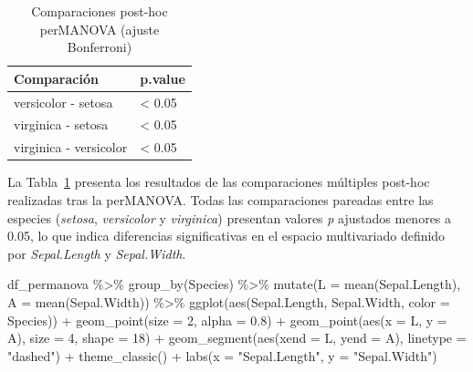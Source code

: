 \documentclass[
  spanish,
  11pt,
  a4paper,
  DIV=11,
  numbers=noendperiod]{scrartcl}
\newenvironment{Shaded}{\begin{snugshade}}{\end{snugshade}}
\newcommand{\AttributeTok}[1]{\textcolor[rgb]{0.40,0.45,0.13}{#1}}
\newcommand{\DecValTok}[1]{\textcolor[rgb]{0.68,0.00,0.00}{#1}}
\newcommand{\FloatTok}[1]{\textcolor[rgb]{0.68,0.00,0.00}{#1}}
\newcommand{\FunctionTok}[1]{\textcolor[rgb]{0.28,0.35,0.67}{#1}}
\newcommand{\NormalTok}[1]{\textcolor[rgb]{0.00,0.23,0.31}{#1}}
\newcommand{\SpecialCharTok}[1]{\textcolor[rgb]{0.37,0.37,0.37}{#1}}
\newcommand{\StringTok}[1]{\textcolor[rgb]{0.13,0.47,0.30}{#1}}
\begin{document}
\begin{longtable}[]{@{}ll@{}}

\caption{\label{tbl-permanova-posthoc}Comparaciones post-hoc perMANOVA
(ajuste Bonferroni)}

\tabularnewline

\toprule\noalign{}
Comparación & p.value \\
\midrule\noalign{}
\endhead
\bottomrule\noalign{}
\endlastfoot
versicolor - setosa & \textless{} 0.05 \\
virginica - setosa & \textless{} 0.05 \\
virginica - versicolor & \textless{} 0.05 \\

\end{longtable}

La Tabla~\ref{tbl-permanova-posthoc} presenta los resultados de las
comparaciones múltiples post-hoc realizadas tras la perMANOVA. Todas las
comparaciones pareadas entre las especies (\emph{setosa},
\emph{versicolor} y \emph{virginica}) presentan valores \emph{p}
ajustados menores a 0.05, lo que indica diferencias significativas en el
espacio multivariado definido por \emph{Sepal.Length} y
\emph{Sepal.Width}.

\begin{Shaded}
\begin{Highlighting}[numbers=left,,]
\NormalTok{df\_permanova }\SpecialCharTok{\%\textgreater{}\%}
  \FunctionTok{group\_by}\NormalTok{(Species) }\SpecialCharTok{\%\textgreater{}\%}
  \FunctionTok{mutate}\NormalTok{(}\AttributeTok{L =} \FunctionTok{mean}\NormalTok{(Sepal.Length), }\AttributeTok{A =} \FunctionTok{mean}\NormalTok{(Sepal.Width)) }\SpecialCharTok{\%\textgreater{}\%}
  \FunctionTok{ggplot}\NormalTok{(}\FunctionTok{aes}\NormalTok{(Sepal.Length, Sepal.Width, }\AttributeTok{color =}\NormalTok{ Species)) }\SpecialCharTok{+}
  \FunctionTok{geom\_point}\NormalTok{(}\AttributeTok{size =} \DecValTok{2}\NormalTok{, }\AttributeTok{alpha =} \FloatTok{0.8}\NormalTok{) }\SpecialCharTok{+}
  \FunctionTok{geom\_point}\NormalTok{(}\FunctionTok{aes}\NormalTok{(}\AttributeTok{x =}\NormalTok{ L, }\AttributeTok{y =}\NormalTok{ A), }\AttributeTok{size =} \DecValTok{4}\NormalTok{, }\AttributeTok{shape =} \DecValTok{18}\NormalTok{) }\SpecialCharTok{+}
  \FunctionTok{geom\_segment}\NormalTok{(}\FunctionTok{aes}\NormalTok{(}\AttributeTok{xend =}\NormalTok{ L, }\AttributeTok{yend =}\NormalTok{ A), }\AttributeTok{linetype =} \StringTok{"dashed"}\NormalTok{) }\SpecialCharTok{+}
  \FunctionTok{theme\_classic}\NormalTok{() }\SpecialCharTok{+}
  \FunctionTok{labs}\NormalTok{(}\AttributeTok{x =} \StringTok{"Sepal.Length"}\NormalTok{, }\AttributeTok{y =} \StringTok{"Sepal.Width"}\NormalTok{)}
\end{Highlighting}
\end{Shaded}
\end{document}
